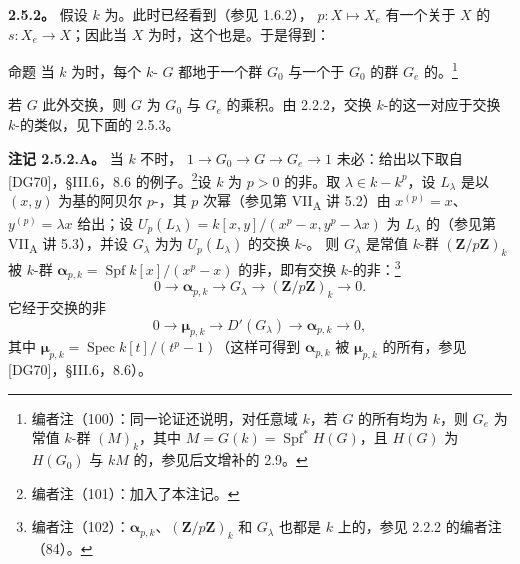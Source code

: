 \textbf{2.5.2。} 假设 $k$ 为。此时已经看到（参见 1.6.2）， $p:X\mapsto X_e$ 有一个关于 $X$ 的 $s:X_e\to X$；因此当 $X$ 为时，这个也是。于是得到：
\begin{SGAresult}{命题}{}
当 $k$ 为时，每个 $k$- $G$ 都地于一个群 $G_0$ 与一个于 $G_0$ 的群 $G_e$ 的。\footnote{编者注（100）：同一论证还说明，对任意域 $k$，若 $G$ 的所有均为 $k$，则 $G_e$ 为常值 $k$-群 $(M)_k$，其中 $M=G(k)=\operatorname{Spf}^*H(G)$，且 $H(G)$ 为 $H(G_0)$ 与 $kM$ 的，参见后文增补的 2.9。}
\end{SGAresult}
若 $G$ 此外交换，则 $G$ 为 $G_0$ 与 $G_e$ 的乘积。由 2.2.2，交换 $k$-的这一对应于交换 $k$-的类似，见下面的 2.5.3。

\textbf{注记 2.5.2.A。} 当 $k$ 不时， $1\to G_0\to G\to G_e\to1$ 未必：给出以下取自 [DG70]，§III.6，8.6 的例子。\footnote{编者注（101）：加入了本注记。}设 $k$ 为 $p>0$ 的非。取 $\lambda\in k-k^p$，设 $L_\lambda$ 是以 $(x,y)$ 为基的阿贝尔 $p$-，其 $p$ 次幂（参见第 VII\textsubscript{A} 讲 5.2）由 $x^{(p)}=x$、$y^{(p)}=\lambda x$ 给出；设 $U_p(L_\lambda)=k[x,y]/(x^p-x,y^p-\lambda x)$ 为 $L_\lambda$ 的（参见第 VII\textsubscript{A} 讲 5.3），并设 $G_\lambda$ 为为 $U_p(L_\lambda)$ 的交换 $k$-。
则 $G_\lambda$ 是常值 $k$-群 $(\mathbf Z/p\mathbf Z)_k$ 被 $k$-群 $\boldsymbol\alpha_{p,k}=\operatorname{Spf}k[x]/(x^p-x)$ 的非，即有交换 $k$-的非：\footnote{编者注（102）：$\boldsymbol\alpha_{p,k}$、$(\mathbf Z/p\mathbf Z)_k$ 和 $G_\lambda$ 也都是 $k$ 上的，参见 2.2.2 的编者注（84）。}
\[
0\longrightarrow\boldsymbol\alpha_{p,k}\longrightarrow G_\lambda\longrightarrow(\mathbf Z/p\mathbf Z)_k\longrightarrow0.
\]
它经于交换的非
\[
0\longrightarrow\boldsymbol\mu_{p,k}\longrightarrow D'(G_\lambda)\longrightarrow\boldsymbol\alpha_{p,k}\longrightarrow0,
\]
其中 $\boldsymbol\mu_{p,k}=\operatorname{Spec}k[t]/(t^p-1)$（这样可得到 $\boldsymbol\alpha_{p,k}$ 被 $\boldsymbol\mu_{p,k}$ 的所有，参见 [DG70]，§III.6，8.6）。

